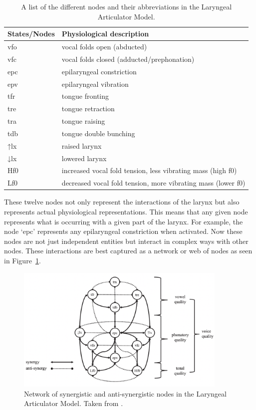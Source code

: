 \documentclass[12pt, letterpaper]{article}
\providecommand{\lsptoprule}{\midrule\toprule}
\providecommand{\lspbottomrule}{\bottomrule\midrule}
\begin{document}
\begin{table}[!ht]
	\centering
	\caption{A list of the different nodes and their abbreviations in the Laryngeal Articulator Model.}
	\label{tab:States}
	 \begin{tabular}{ll}
	  \lsptoprule
	  States/Nodes	&	 Physiological description \\
	  \hline
	  	vfo   	&  vocal folds open (abducted) \\
		vfc    	&  vocal folds closed (adducted/prephonation)\\
		epc   	&  epilaryngeal constriction\\
		epv			&  epilaryngeal vibration \\
		tfr 		&  tongue fronting \\
		tre 		&  tongue retraction \\
		tra 		&  tongue raising \\
		tdb 		&	 tongue double bunching\\
		↑lx     &  raised larynx\\
		↓lx			&  lowered larynx\\
		Hf0			&  increased vocal fold tension, less vibrating mass (high f0)\\
		Lf0			&  decreased vocal fold tension, more vibrating mass (lower f0)\\
	  \lspbottomrule
	 \end{tabular}
\end{table}

These twelve nodes not only represent the interactions of the larynx but also represents actual physiological representations. This means that any given node represents what is occurring with a given part of the larynx. For example, the node `epc'  represents any epilaryngeal constriction when activated. Now these nodes are not just independent entities but interact in complex ways with other nodes. These interactions are best captured as a network or web of nodes as seen in Figure~\ref{fig:LAMNetwork}. 

\begin{figure}[!ht]
	\centering
	\includegraphics[width=0.9\textwidth]{../LAMNetwork.png}
	\caption{Network of synergistic and anti-synergistic nodes in the Laryngeal Articulator Model. Taken from \citet{eslingVoiceQualityLaryngeal2019}.}
	\label{fig:LAMNetwork}
\end{figure}
\end{document}
